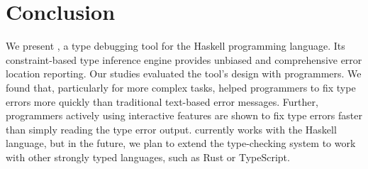 \section{Conclusion}

We present \chameleon{}, a type debugging tool for the Haskell programming language. Its constraint-based type inference engine provides unbiased and comprehensive error location reporting. 
Our studies evaluated the tool's design with programmers. We found that, particularly for more complex tasks, \chameleon{} helped programmers to fix type errors more quickly than traditional text-based error messages. Further, programmers actively using \chameleon{} interactive features are shown to fix type errors faster than simply reading the type error output.
\chameleon{} currently works with the Haskell language, but in the future, we plan to extend the type-checking system to work with other strongly typed languages, such as Rust or TypeScript.